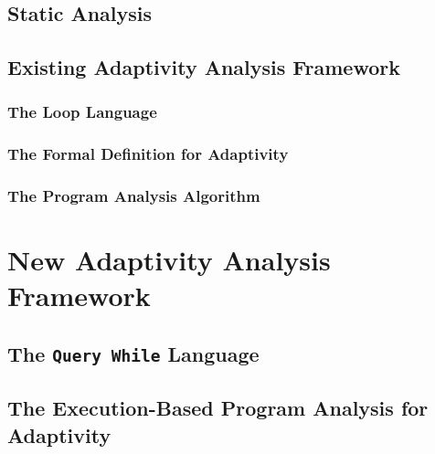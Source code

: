 \documentclass[12pt, letterpaper]{report}   %
\begin{document}
\section{Static Analysis}
\label{sec:prework-static}

\section{Existing Adaptivity Analysis Framework}
\label{sec:prework-adapt}
\subsection{The Loop Language}
\subsection{The Formal Definition for Adaptivity}
\subsection{The Program Analysis Algorithm}




\chapter{New Adaptivity Analysis Framework}
\label{sec:adapt-analysis}


% 
\clearpage
\section{The {\tt Query While} Language}
\label{ch:language}


\clearpage
\section{The Execution-Based Program Analysis for Adaptivity}
\label{ch:dynamic}

\end{document}
